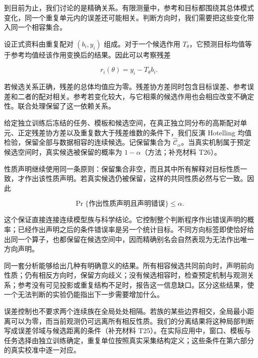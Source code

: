 \documentclass[11pt,a4paper]{article}
\begin{document}
到目前为止，我们讨论的是精确关系。有限测量中，参考和目标都围绕其总体模式变化，同一个重复单元内的误差还可能相关。判断方向时，我们需要把这些变化带入同一个相容集合。

\par
\noindent\begin{minipage}{\linewidth}

设正式资料由重复配对 \((b_i,y_i)\) 组成。对于一个候选作用
\(T_\theta\)，它预测目标均值等于参考均值经该作用变换后的结果。因此可以考察残差

\[
r_i(\theta)=y_i-T_\theta b_i.
\]

\end{minipage}\par

若候选关系正确，残差的总体均值应为零。残差协方差同时包含目标误差、参考误差和二者的配对相关。参考若变化较大，与它相乘的候选作用也会相应改变不确定性。联合处理保留了这一依赖关系。

给定独立训练后冻结的任务、模板和候选空间，在真正独立同分布的高斯配对单元、正定残差协方差以及重复数大于残差维数的条件下，我们反演
Hotelling 均值检验，保留全部与数据相容的连续候选。记保留集合为
\(\widehat{\mathcal C}_\alpha\)。当真实机制属于预定候选空间时，真实候选被保留的概率为
\(1-\alpha\)（方法；补充材料 T26）。

\par
\noindent\begin{minipage}{\linewidth}

性质声明继续使用同一条原则：保留集合非空，而且其中所有解释对目标性质一致，才作出该性质声明。若真实候选仍被保留，这样的共同性质必然与它一致。因此

\[
\Pr\{\text{作出性质声明且声明错误}\}\leq\alpha.
\]

\end{minipage}\par

这个保证直接连接连续模型族与科学结论。它控制整个判断程序作出错误声明的概率；已经作出声明之后的条件错误率是另一个统计目标。不同方向标签即使恰好给出同一个算子，也都保留在候选空间中，因而精确别名会自然表现为无法作出唯一方向声明。

同一套分析能够给出几种有明确意义的结果。所有相容候选共同前向时，声明前向性质；仍有相反方向时，保留方向歧义；没有候选相容时，检查预定机制与观测关系；参考没有可见投影或重复结构不足时，报告这一信息缺口。区分这些结果，使一个无法判断的实验仍能指出下一步需要增加什么。

误差控制也不要求两个连续族在全局处处相隔。若族的某些边界相交，全局最小距离可以为零，而当前观测仍可远离所有相反性质。我们的分离结果将这种局部判断写成误差邻域与候选距离的条件（补充材料
T25）。在实际应用中，窗口、模板与任务选择由独立训练确定，重复单位按照真实采集结构定义；这些条件在第六部分的真实校准中逐一对应。
\end{document}
